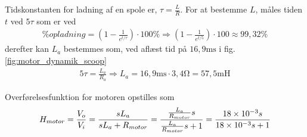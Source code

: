 Tidskonstanten for ladning af en spole er, $\tau = \frac{L}{R}$.
For at bestemme $L$, måles tiden $t$ ved $5\tau$ som er ved
\begin{align}
	\% opladning = \left( 1 - \frac{1}{e^{t/\tau}} \right) \cdot 100\% \Rightarrow  \left( 1 - \frac{1}{e^{t/5}} \right) \cdot 100 \approx 99,32\% 
\end{align}
derefter kan $L_a$ bestemmes som, ved aflæst tid på $16,9\si{\milli\second}$ i fig. \ref{fig:motor_dynamik_scoop} 
\begin{align}
	5\tau = \frac{L_a}{R_a} \Rightarrow L_a = 16,9\si{\milli\second} \cdot 3,4 \si{\ohm} = 57,5 \si{\milli\henry}
\end{align}

Overførelsesfunktion for motoren opstilles som
\begin{align}
H_{motor} = \frac{V_o}{V_i} = \frac{s L_a}{s L_a + R_{motor}} = \frac{ \frac{L_a}{R_{motor}}s}{ \frac{L_a}{R_{motor}}s +1} = \frac{\num{18E-3}s}{\num{18E-3}s +1}
\end{align}  


